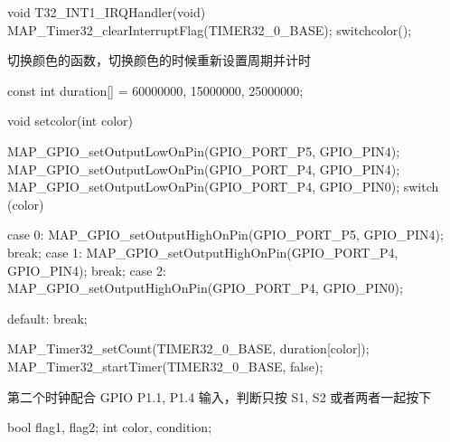 \documentclass[a4paper,10pt,UTF8]{paper}
\numberwithin{equation}{section}
\numberwithin{figure}{section}
\begin{document}
\begin{ccode}
    void T32_INT1_IRQHandler(void)
    {
        MAP_Timer32_clearInterruptFlag(TIMER32_0_BASE);
        switchcolor();
    }
\end{ccode}

切换颜色的函数，切换颜色的时候重新设置周期并计时

\begin{ccode}
    const int duration[] = {
    60000000, 15000000, 25000000};

    void setcolor(int color)
    {
        MAP_GPIO_setOutputLowOnPin(GPIO_PORT_P5, GPIO_PIN4);
        MAP_GPIO_setOutputLowOnPin(GPIO_PORT_P4, GPIO_PIN4);
        MAP_GPIO_setOutputLowOnPin(GPIO_PORT_P4, GPIO_PIN0);
        switch (color)
        {
        case 0:
            MAP_GPIO_setOutputHighOnPin(GPIO_PORT_P5, GPIO_PIN4);
            break;
        case 1:
            MAP_GPIO_setOutputHighOnPin(GPIO_PORT_P4, GPIO_PIN4);
            break;
        case 2:
            MAP_GPIO_setOutputHighOnPin(GPIO_PORT_P4, GPIO_PIN0);

        default:
            break;
        }
        MAP_Timer32_setCount(TIMER32_0_BASE, duration[color]);
        MAP_Timer32_startTimer(TIMER32_0_BASE, false);
    }
\end{ccode}

第二个时钟配合 GPIO P1.1, P1.4 输入，判断只按 S1, S2 或者两者一起按下

\begin{ccode}
    bool flag1, flag2;
    int color, condition;
\end{ccode}
\end{document}
